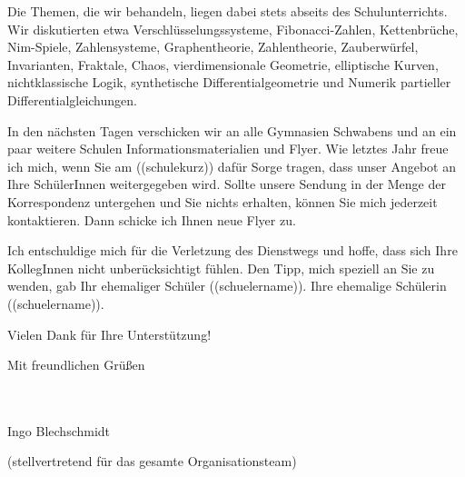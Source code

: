 \documentclass{../zirkelbrief}
\begin{document}
Die Themen, die wir behandeln, liegen dabei stets abseits des
Schulunterrichts. Wir diskutierten etwa Verschlüsselungssysteme,
Fibonacci-Zahlen, Kettenbrüche, Nim-Spiele, Zahlensysteme, Graphentheorie,
Zahlentheorie, Zauberwürfel, Invarianten, Fraktale, Chaos,
vierdimensionale Geometrie, elliptische Kurven, nichtklassische Logik,
synthetische Differentialgeometrie und Numerik partieller
Differentialgleichungen.

In den nächsten Tagen verschicken wir an alle Gymnasien Schwabens und an ein
paar weitere Schulen Informationsmaterialien und Flyer. Wie letztes Jahr
freue ich mich, wenn Sie am ((schulekurz)) dafür Sorge tragen, dass unser Angebot
an Ihre SchülerInnen weitergegeben wird. Sollte unsere Sendung in der Menge der
Korrespondenz untergehen und Sie nichts erhalten, können Sie mich jederzeit
kontaktieren. Dann schicke ich Ihnen neue Flyer zu.

Ich entschuldige mich für die Verletzung des Dienstwegs und hoffe, dass sich
Ihre KollegInnen nicht unberücksichtigt fühlen. Den Tipp, mich speziell an Sie
zu wenden, gab
\ifschuelermaennlich
Ihr ehemaliger Schüler ((schuelername)).
\else
Ihre ehemalige Schülerin ((schuelername)).
\fi

Vielen Dank für Ihre Unterstützung!

Mit freundlichen Grüßen

\ \\
\ \\

Ingo Blechschmidt

\vspace{-0.2cm}

{\small (stellvertretend für das gesamte Organisationsteam)}
\end{document}
